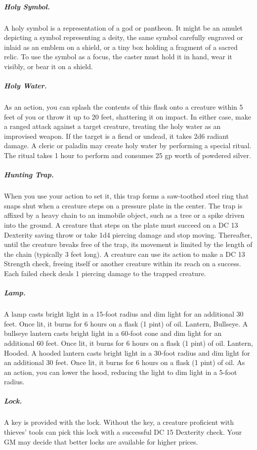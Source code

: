 \subparagraph*{Holy Symbol.} A holy symbol is a representation of a god or pantheon. It might be an amulet depicting a symbol representing a deity, the same symbol carefully engraved or inlaid as an emblem on a shield, or a tiny box holding a fragment of a sacred relic. To use the symbol as a focus, the caster must hold it in hand, wear it visibly, or bear it on a shield.

\subparagraph*{Holy Water.} As an action, you can splash the contents of this flask onto a creature within 5 feet of you or throw it up to 20 feet, shattering it on impact. In either case, make a ranged attack against a target creature, treating the holy water as an improvised weapon. If the target is a fiend or undead, it takes 2d6 radiant damage.
A cleric or paladin may create holy water by performing a special ritual. The ritual takes 1 hour to perform and consumes 25 gp worth of powdered silver.

\subparagraph*{Hunting Trap.} When you use your action to set it, this trap forms a saw-toothed steel ring that snaps shut when a creature steps on a pressure plate in the center. The trap is affixed by a heavy chain to an immobile object, such as a tree or a spike driven into the ground. A creature that steps on the plate must succeed on a DC 13 Dexterity saving throw or take 1d4 piercing damage and stop moving. Thereafter, until the creature breaks free of the trap, its movement is limited by the length of the chain (typically 3 feet long). A creature can use its action to make a DC 13 Strength check, freeing itself or another creature within its reach on a success. Each failed check deals 1 piercing damage to the trapped creature.

\subparagraph*{Lamp.} A lamp casts bright light in a 15-foot radius and dim light for an additional 30 feet. Once lit, it burns for 6 hours on a flask (1 pint) of oil.
Lantern, Bullseye. A bullseye lantern casts bright light in a 60-foot cone and dim light for an additional 60 feet. Once lit, it burns for 6 hours on a flask (1 pint) of oil.
Lantern, Hooded. A hooded lantern casts bright light in a 30-foot radius and dim light for an additional 30 feet. Once lit, it burns for 6 hours on a flask (1 pint) of oil. As an action, you can lower the hood, reducing the light to dim light in a 5-foot radius.

\subparagraph*{Lock.} A key is provided with the lock. Without the key, a creature proficient with thieves' tools can pick this lock with a successful DC 15 Dexterity check. Your GM may decide that better locks are available for higher prices.

